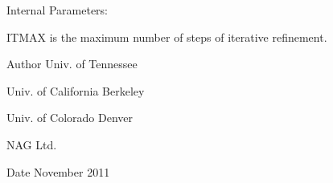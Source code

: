\begin{DoxyParagraph}{Internal Parameters\+: }
\begin{DoxyVerb}  ITMAX is the maximum number of steps of iterative refinement.\end{DoxyVerb}
 
\end{DoxyParagraph}
\begin{DoxyAuthor}{Author}
Univ. of Tennessee 

Univ. of California Berkeley 

Univ. of Colorado Denver 

N\+A\+G Ltd. 
\end{DoxyAuthor}
\begin{DoxyDate}{Date}
November 2011 
\end{DoxyDate}
